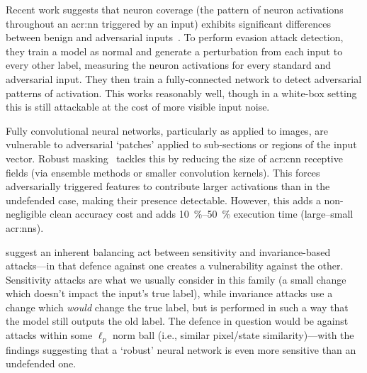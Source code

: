 
Recent work suggests that neuron coverage (the pattern of neuron activations throughout an \gls{acr:nn} triggered by an input) exhibits significant differences between benign and adversarial inputs~\parencite{DBLP:conf/eurosp/SperlKCLB20}.
To perform evasion attack detection, they train a model as normal and generate a perturbation from each input to every other label, measuring the neuron activations for every standard and adversarial input.
They then train a fully-connected network to detect adversarial patterns of activation.
This works reasonably well, though in a white-box setting this is still attackable at the cost of more visible input noise.


Fully convolutional neural networks, particularly as applied to images, are vulnerable to adversarial `patches' applied to sub-sections or regions of the input vector.
Robust masking~\parencite{DBLP:conf/uss/0001BSM21} tackles this by reducing the size of \gls{acr:cnn} receptive fields (via ensemble methods or smaller convolution kernels).
This forces adversarially triggered features to contribute larger activations than in the undefended case, making their presence detectable.
However, this adds a non-negligible clean accuracy cost and adds \qtyrange{10}{50}{\percent} execution time (large--small \glspl{acr:nn}).

\Textcite{DBLP:journals/corr/abs-2002-04599} suggest an inherent balancing act between sensitivity and invariance-based attacks---in that defence against one creates a vulnerability against the other.
Sensitivity attacks are what we usually consider in this family (a small change which doesn't impact the input's true label), while invariance attacks use a change which \emph{would} change the true label, but is performed in such a way that the model still outputs the old label.
The defence in question would be against attacks within some $\ell_p$ norm ball (i.e., similar pixel/state similarity)---with the findings suggesting that a `robust' neural network is even more sensitive than an undefended one.

